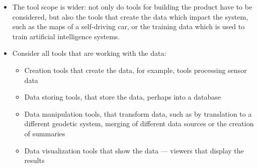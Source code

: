 \begin{itemize}
\item The tool scope is wider: not only do tools for building the product have to be considered,
  but also the tools that create the data which impact the system,
  such as the maps of a self-driving car, or the training data which is used to train artificial intelligence  systems.
\item Consider all tools that are working with the data:
  \begin{itemize}
  \item Creation tools that create the data, for example, tools processing sensor data
  \item Data storing tools, that store the data, perhaps into a database
  \item Data manipulation tools, that transform data, such as by translation to a different geodetic system, merging of different data sources or the creation of summaries
  \item Data visualization tools that show the data --- viewers that display the results
  \end{itemize}
  

\end{itemize}
